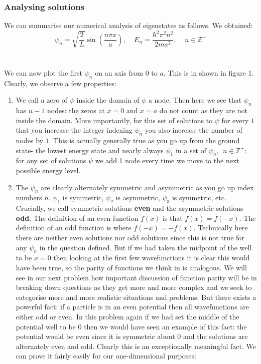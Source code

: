 \subsubsection{Analysing solutions}
We can summarise our numerical analysis of eigenstates as follows. We obtained:
$$
\psi_n=\sqrt{\frac{2}{L}}\sin(\frac{n\pi x}{a}), \:\:\:\:\: E_n=\frac{\hbar^2\pi^2 n^2}{2ma^2}, \:\:\:\:\: n \in \mathbb{Z}^+
$$
\\\\
We can now plot the first $\psi_n$ on an axis from $0$ to $a$. This is in shown in figure 1.
Clearly, we observe a few properties:
\begin{enumerate}
    \item We call a zero of $\psi$ inside the domain of $\psi$ a node. Then here we see that $\psi_n$ has $n-1$ nodes: the zeros at $x=0$ and $x=a$ do not count as they are not inside the domain. More importantly, for this set of solutions to $\psi$ for every $1$ that you increase the integer indexing $\psi_n$ you also increase the number of nodes by $1$. This is actually generally true as you go up from the ground state- the lowest energy state and nearly always $\psi_1$ in a set of $\psi_n, \:\: n \in \mathbb{Z}^+$: for any set of solutions $\psi$ we add 1 node every time we move to the next possible energy level.
    \\
    \item The $\psi_n$ are clearly alternately symmetric and asymmetric as you go up index numbers $n$. $\psi_1$ is symmetric, $\psi_2$ is asymmetric, $\psi_3$ is symmetric, etc. Crucially, we call symmetric solutions \textbf{even} and the asymmetric solutions \textbf{odd}. The definition of an even function $f(x)$ is that $f(x)=f(-x)$. The definition of an odd function is where $f(-x)=-f(x)$. Technically here there are neither even solutions nor odd solutions since this is not true for any $\psi_n$ in the question defined. But if we had taken the midpoint of the well to be $x=0$ then looking at the first few wavefunctions it is clear this would have been true, so the parity of functions we think in is analogous. We will see in our next problem how important discussion of function parity will be in breaking down questions as they get more and more complex and we seek to categorise more and more realistic situations and problems. But there exists a powerful fact: if a particle is in an even potential then all wavefunctions are either odd or even. In this problem again if we had set the middle of the potential well to be $0$ then we would have seen an example of this fact: the potential would be even since it is symmetric about $0$ and the solutions are alternately even and odd. Clearly this is an exceptionally meaningful fact. We can prove it fairly easily for our one-dimensional purposes:

\end{enumerate}
